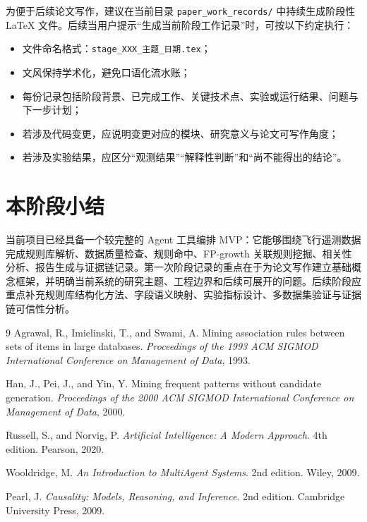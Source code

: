 \documentclass[UTF8,a4paper,zihao=-4]{ctexart}
\begin{document}
为便于后续论文写作，建议在当前目录 \texttt{paper\_work\_records/} 中持续生成阶段性 LaTeX 文件。后续当用户提示“生成当前阶段工作记录”时，可按以下约定执行：
\begin{itemize}
  \item 文件命名格式：\texttt{stage\_XXX\_主题\_日期.tex}；
  \item 文风保持学术化，避免口语化流水账；
  \item 每份记录包括阶段背景、已完成工作、关键技术点、实验或运行结果、问题与下一步计划；
  \item 若涉及代码变更，应说明变更对应的模块、研究意义与论文可写作角度；
  \item 若涉及实验结果，应区分“观测结果”“解释性判断”和“尚不能得出的结论”。
\end{itemize}

\section{本阶段小结}

当前项目已经具备一个较完整的 Agent 工具编排 MVP：它能够围绕飞行遥测数据完成规则库解析、数据质量检查、规则命中、FP-growth 关联规则挖掘、相关性分析、报告生成与证据链记录。第一次阶段记录的重点在于为论文写作建立基础概念框架，并明确当前系统的研究主题、工程边界和后续可展开的问题。后续阶段应重点补充规则库结构化方法、字段语义映射、实验指标设计、多数据集验证与证据链可信性分析。

\begin{thebibliography}{9}
Agrawal, R., Imielinski, T., and Swami, A. Mining association rules between sets of items in large databases. \textit{Proceedings of the 1993 ACM SIGMOD International Conference on Management of Data}, 1993.

Han, J., Pei, J., and Yin, Y. Mining frequent patterns without candidate generation. \textit{Proceedings of the 2000 ACM SIGMOD International Conference on Management of Data}, 2000.

Russell, S., and Norvig, P. \textit{Artificial Intelligence: A Modern Approach}. 4th edition. Pearson, 2020.

Wooldridge, M. \textit{An Introduction to MultiAgent Systems}. 2nd edition. Wiley, 2009.

Pearl, J. \textit{Causality: Models, Reasoning, and Inference}. 2nd edition. Cambridge University Press, 2009.
\end{thebibliography}
\end{document}
